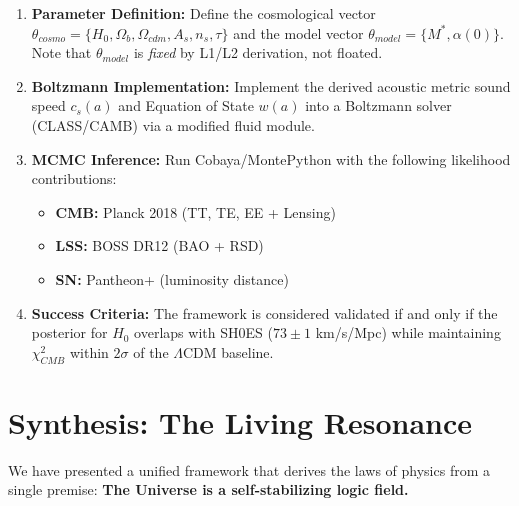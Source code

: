 \documentclass[a4paper,12pt]{article}
\begin{document}
\begin{enumerate}
    \item \textbf{Parameter Definition:}
    Define the cosmological vector $\theta_{cosmo} = \{H_0, \Omega_b, \Omega_{cdm}, A_s, n_s, \tau\}$ and the model vector $\theta_{model} = \{M^*, \alpha(0)\}$.
    Note that $\theta_{model}$ is \emph{fixed} by L1/L2 derivation, not floated.

    \item \textbf{Boltzmann Implementation:}
    Implement the derived acoustic metric sound speed $c_s(a)$ and Equation of State $w(a)$ into a Boltzmann solver (CLASS/CAMB) via a modified fluid module.

    \item \textbf{MCMC Inference:}
    Run Cobaya/MontePython with the following likelihood contributions:
    \begin{itemize}
        \item \textbf{CMB:} Planck 2018 (TT, TE, EE + Lensing)
        \item \textbf{LSS:} BOSS DR12 (BAO + RSD)
        \item \textbf{SN:} Pantheon+ (luminosity distance)
    \end{itemize}

    \item \textbf{Success Criteria:}
    The framework is considered validated if and only if the posterior for $H_0$ overlaps with SH0ES ($73 \pm 1$ km/s/Mpc) while maintaining $\chi^2_{CMB}$ within $2\sigma$ of the $\Lambda$CDM baseline.
\end{enumerate}

\section{Synthesis: The Living Resonance}

We have presented a unified framework that derives the laws of physics from a single premise: \textbf{The Universe is a self-stabilizing logic field.}
\end{document}
